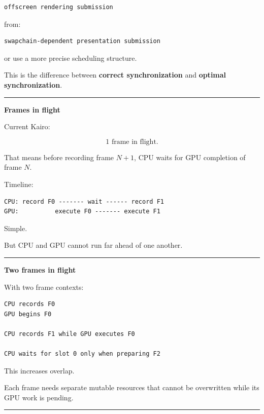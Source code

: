 \begin{verbatim}
offscreen rendering submission
\end{verbatim}

from:

\begin{verbatim}
swapchain-dependent presentation submission
\end{verbatim}

or use a more precise scheduling structure.

This is the difference between \textbf{correct synchronization} and \textbf{optimal synchronization}.

\begin{center}\rule{0.5\linewidth}{0.5pt}\end{center}

\textbf{Frames in flight}

Current Kairo:

\[
\boxed{1\text{ frame in flight}.}
\]

That means before recording frame \(N+1\), CPU waits for GPU completion of frame \(N\).

Timeline:

\begin{verbatim}
CPU: record F0 ------- wait ------ record F1
GPU:          execute F0 ------- execute F1
\end{verbatim}

Simple.

But CPU and GPU cannot run far ahead of one another.

\begin{center}\rule{0.5\linewidth}{0.5pt}\end{center}

\textbf{Two frames in flight}

With two frame contexts:

\begin{verbatim}
CPU records F0
GPU begins F0

CPU records F1 while GPU executes F0

CPU waits for slot 0 only when preparing F2
\end{verbatim}

This increases overlap.

Each frame needs separate mutable resources that cannot be overwritten while its GPU work is pending.

\begin{center}\rule{0.5\linewidth}{0.5pt}\end{center}

